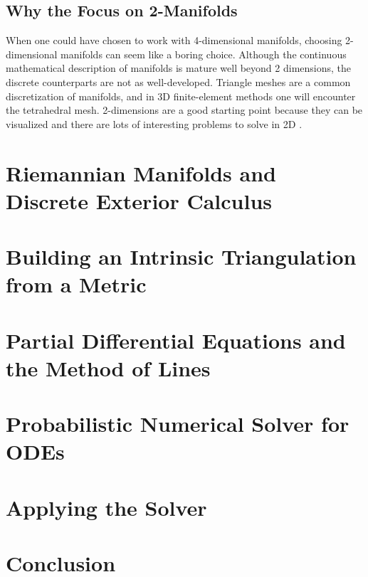 \subsection*{Why the Focus on 2-Manifolds}
When one could have chosen to work with 4-dimensional manifolds, choosing 2-dimensional manifolds can seem like a boring choice. Although the continuous mathematical description of manifolds is mature well beyond 2 dimensions, the discrete counterparts are not as well-developed\cite{craneDDG}. Triangle meshes are a common discretization of manifolds, and in 3D finite-element methods one will encounter the tetrahedral mesh. 2-dimensions are a good starting point because they can be visualized and there are lots of interesting problems to solve in 2D \cite{walk_on_stars} \cite{repulsive_curves} \cite{diffusionnet}. 


\clearpage
\section{Riemannian Manifolds and Discrete Exterior Calculus}\label{sec:manifolds}


\clearpage
\section{Building an Intrinsic Triangulation from a Metric}\label{sec:intrinsic_triangulation}


\clearpage
\section{Partial Differential Equations and the Method of Lines}\label{sec:pde}


\clearpage
\section{Probabilistic Numerical Solver for ODEs}\label{sec:prior}


\clearpage
\section{Applying the Solver}\label{sec:solver_experiments}


\section{Conclusion}
  
\printbibliography


